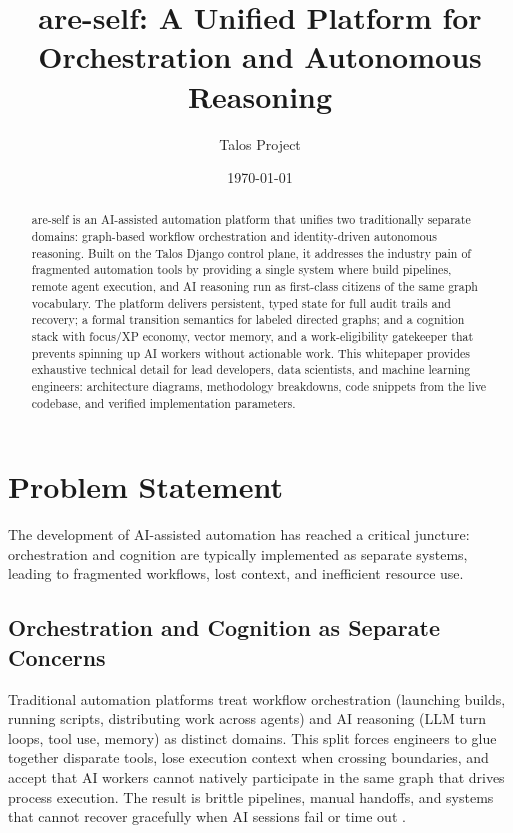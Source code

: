\documentclass[11pt]{article}
\title{are-self: A Unified Platform for Orchestration and Autonomous Reasoning}
\author{Talos Project}
\date{\today}
\begin{document}
	\sloppy
	\maketitle

	\begin{abstract}
		are-self is an AI-assisted automation platform that unifies two traditionally separate domains: graph-based workflow orchestration and identity-driven autonomous reasoning. Built on the Talos Django control plane, it addresses the industry pain of fragmented automation tools by providing a single system where build pipelines, remote agent execution, and AI reasoning run as first-class citizens of the same graph vocabulary. The platform delivers persistent, typed state for full audit trails and recovery; a formal transition semantics for labeled directed graphs; and a cognition stack with focus/XP economy, vector memory, and a work-eligibility gatekeeper that prevents spinning up AI workers without actionable work. This whitepaper provides exhaustive technical detail for lead developers, data scientists, and machine learning engineers: architecture diagrams, methodology breakdowns, code snippets from the live codebase, and verified implementation parameters.
	\end{abstract}

	\section{Problem Statement}
	\label{sec:problem}

	The development of AI-assisted automation has reached a critical juncture: orchestration and cognition are typically implemented as separate systems, leading to fragmented workflows, lost context, and inefficient resource use.

	\subsection{Orchestration and Cognition as Separate Concerns}
	Traditional automation platforms treat workflow orchestration (launching builds, running scripts, distributing work across agents) and AI reasoning (LLM turn loops, tool use, memory) as distinct domains. This split forces engineers to glue together disparate tools, lose execution context when crossing boundaries, and accept that AI workers cannot natively participate in the same graph that drives process execution. The result is brittle pipelines, manual handoffs, and systems that cannot recover gracefully when AI sessions fail or time out \cite{talosLiveCodebase}.
\end{document}
